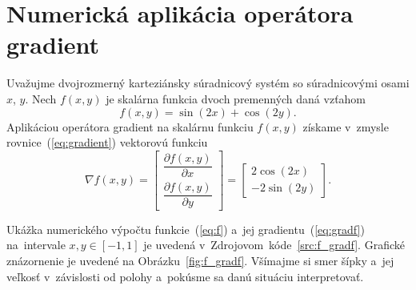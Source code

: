 \documentclass[a4paper, 12pt]{book}
\begin{document}

\appendix
\chapter{Numerická aplikácia operátora gradient}
\label{app:numerical_application_of_gradient}

Uvažujme dvojrozmerný karteziánsky súradnicový systém so súradnicovými osami 
$x$, $y$.  Nech $f(x, y)$ je skalárna funkcia dvoch premenných daná vzťahom
%
\begin{equation}
\label{eq:f}
f(x, y) = \sin(2x) + \cos(2y){.}
\end{equation}
%
Aplikáciou operátora gradient na skalárnu funkciu $f(x, y)$ získame v~zmysle
rovnice~(\ref{eq:gradient}) vektorovú funkciu
%
\begin{equation}
\label{eq:gradf}
\nabla f(x, y) =
\begin{bmatrix}
\dfrac{\partial f(x, y)}{\partial x} \\[2ex]
\dfrac{\partial f(x, y)}{\partial y}
\end{bmatrix}
=
\begin{bmatrix}
2 \cos(2x) \\[2ex]
-2 \sin(2y)
\end{bmatrix}
{.}
\end{equation}

Ukážka numerického výpočtu funkcie~(\ref{eq:f}) a~jej 
gradientu~(\ref{eq:gradf}) na~intervale $x, y \in [-1, 1]$ je uvedená 
v~Zdrojovom~kóde~\ref{src:f_gradf}.  Grafické znázornenie je uvedené na 
Obrázku~\ref{fig:f_gradf}.  Všímajme si smer šípky a~jej veľkosť v~závislosti 
od polohy a~pokúsme sa danú situáciu interpretovať.


\end{document}
